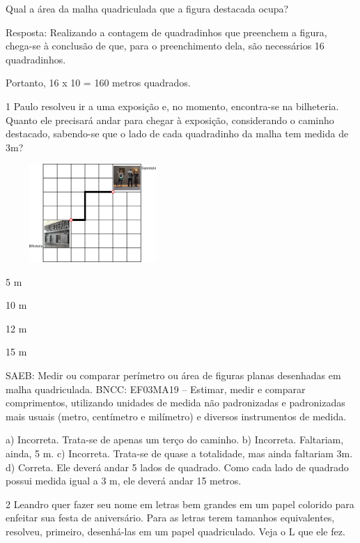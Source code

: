 Qual a área da malha quadriculada que a figura destacada ocupa?


Resposta:
Realizando a contagem de quadradinhos que preenchem a figura, chega-se à conclusão de que, para o preenchimento dela, são necessários 16 quadradinhos.

Portanto, 16 x 10 = 160 metros quadrados.


\num{1} Paulo resolveu ir a uma exposição e, no momento, encontra-se na
bilheteria. Quanto ele precisará andar para chegar à exposição,
considerando o caminho destacado, sabendo-se que o lado de cada
quadradinho da malha tem medida de 3m?


\includegraphics[width=2.60897in,height=1.46587in]{media/image61.png}

\begin{escolha}
\item
  5 m
\item
  10 m
\item
  12 m
\item
  15 m
\end{escolha}

SAEB: Medir ou comparar perímetro ou área de figuras planas desenhadas em malha quadriculada. 
BNCC: EF03MA19 -- Estimar, medir e comparar comprimentos, utilizando unidades de medida
não padronizadas e padronizadas mais usuais (metro, centímetro e milímetro) e diversos
instrumentos de medida.

a) Incorreta. Trata-se de apenas um terço do caminho.
b) Incorreta. Faltariam, ainda, 5 m.
c) Incorreta. Trata-se de quase a totalidade, mas ainda faltariam 3m.
d) Correta. Ele deverá andar 5 lados de quadrado. Como cada lado de quadrado possui
medida igual a 3 m, ele deverá andar 15 metros.

\num{2} Leandro quer fazer seu nome em letras bem grandes em um papel colorido para enfeitar sua festa de aniversário. Para as letras terem tamanhos equivalentes, resolveu, primeiro, desenhá-las em um papel quadriculado. Veja o L que ele fez.

